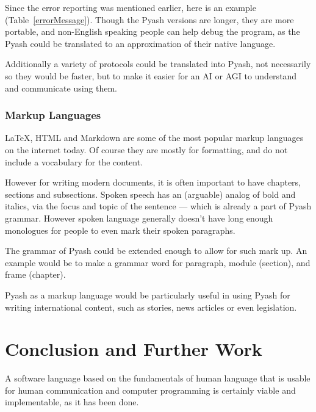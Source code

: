 Since the error reporting was mentioned earlier, here is an example
(Table~\ref{errorMessage}). Though the Pyash versions are longer, 
they are more portable, and non-English speaking people can help debug the 
program, as the Pyash could be translated to an approximation of their 
native language. 

Additionally a variety of protocols could be translated into Pyash, not
necessarily so they would be faster, but to make it easier for an AI or AGI to
understand and communicate using them. 

\subsubsection{Markup Languages}
LaTeX, HTML and Markdown are some of the most popular markup languages on the
internet today. Of course they are mostly for formatting, and do not include a
vocabulary for the content.

However for writing modern documents, it is often important to have chapters,
sections and subsections.   Spoken speech has an (arguable) analog of bold 
and italics, via the focus and topic of the sentence --- which is already a part
of Pyash grammar. However spoken language
generally doesn't have long enough monologues for people to even mark their
spoken paragraphs.

The grammar of Pyash could be extended enough to allow for such mark up. An
example would be to make a grammar word for paragraph, module (section), and
frame (chapter). 

Pyash as a markup language would be particularly useful in using Pyash for writing
international content, such as stories, news articles or even legislation. 

\section{Conclusion and Further Work}

A software language based on the fundamentals of human language that is usable
for human communication and computer programming is certainly viable and 
implementable, as it has been done. 

